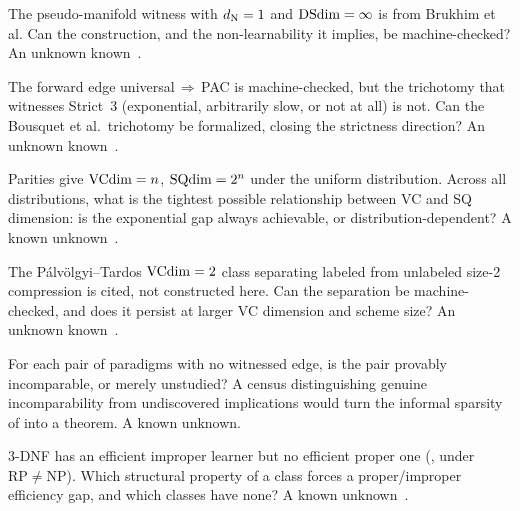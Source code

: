 \begin{openprob}
\label{op:formalize-ds-natarajan}
The pseudo-manifold witness with $d_{\mathrm{N}} = 1$ and $\mathrm{DSdim} = \infty$ is from
Brukhim et al. Can the construction, and the non-learnability it implies,
be machine-checked? An unknown
known~\cite{BrukhimCarmonDinurMoranYehudayoff2022}.
\end{openprob}

\begin{openprob}
\label{op:formalize-trichotomy}
The forward edge universal$\,\Rightarrow\,$PAC is machine-checked, but the
trichotomy that witnesses Strict~3 (exponential, arbitrarily slow, or not
at all) is not.  Can the Bousquet et al.\ trichotomy be formalized,
closing the strictness direction?  An unknown
known~\cite{BousquetHannekeMoranVanHandelYehudayoff2021}.
\end{openprob}

\begin{openprob}
\label{op:sq-vc-quantitative}
Parities give $\mathrm{VCdim} = n$, $\mathrm{SQdim} = 2^n$ under the uniform distribution.
Across all distributions, what is the tightest possible relationship
between VC and SQ dimension: is the exponential gap always achievable, or
distribution-dependent?  A known
unknown~\cite{BlumFurstJacksonKearnsMansourRudich1994}.
\end{openprob}

\begin{openprob}
\label{op:formalize-compression-sep}
The P\'alv\"olgyi--Tardos $\mathrm{VCdim} = 2$ class separating labeled from unlabeled
size-2 compression is cited, not constructed here.  Can the separation be
machine-checked, and does it persist at larger VC dimension and scheme
size?  An unknown known~\cite{PalvolgyiTardos2020}.
\end{openprob}

\begin{openprob}
\label{op:lattice-completeness}
For each pair of paradigms with no witnessed edge, is the pair provably
incomparable, or merely unstudied?  A census distinguishing genuine
incomparability from undiscovered implications would turn the informal
sparsity of  into a theorem.  A known unknown.
\end{openprob}

\begin{openprob}
\label{op:proper-improper-sep}
3-DNF has an efficient improper learner but no efficient proper one
(, under $\mathrm{RP}\neq\mathrm{NP}$).  Which structural
property of a class forces a proper/improper efficiency gap, and which
classes have none?  A known unknown~\cite{PittValiant1988}.
\end{openprob}


